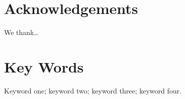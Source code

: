 \documentclass{IOS-Book-Article}
\begin{document}






\printbibliography

\section*{Acknowledgements}
We thank\ldots

\section*{Key Words}
Keyword one; keyword two; keyword three; keyword four.
\end{document}
